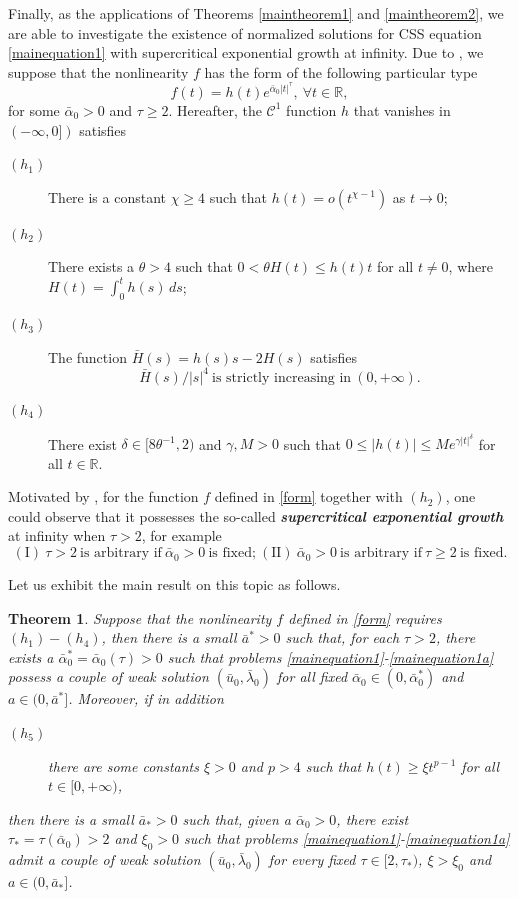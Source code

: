 \documentclass[11pt]{amsart}
\numberwithin{equation}{section}
\newtheorem{theorem}{Theorem}[section]
\theoremstyle{definition}
\newcommand{\R}{\mathbb{R}}
\begin{document}
Finally, as the
 applications of Theorems \ref{maintheorem1} and \ref{maintheorem2},
 we are able to investigate the existence of normalized solutions for CSS equation
 \eqref{mainequation1} with supercritical exponential growth at infinity. Due to
\cite{AS1,AS2}, we suppose that  the nonlinearity $f$ has the form of the following particular type
 \begin{equation}\label{form}
  f(t)=h(t) e^{\bar{\alpha}_0 |t|^\tau},~\forall t\in\R,
\end{equation}
for some $\bar{\alpha}_0>0$
 and $\tau\geq2$. Hereafter, the $\mathcal{C}^1$ function $h$ that vanishes in $(-\infty,0])$ satisfies
\begin{description}
  \item[$(h_1)$] There is a constant $\chi\geq4$ such that $h(t)=o(t^{\chi-1})$ as $t\to0$;
  \item[$(h_2)$] There exists a $\theta>4$ such that $0<\theta H(t) \leq h(t)t$ for all $t\neq0$,
	where $H(t)=\int_{0}^{t}h(s)\,ds$;
\item[$(h_3)$] The function $\bar{H}(s)=h(s)s-2H(s)$ satisfies
\[
 \bar{H}(s)/|s|^{4}~\text{is strictly increasing in}~(0,+\infty).
\]
\item[$(h_4)$] There exist $\delta \in [8\theta^{-1},2)$ and $\gamma,M>0$ such that $0 \leq |h(t)| \leq Me^{\gamma |t|^{\delta}}$
for all $t\in\R$.
\end{description}

Motivated by \cite{AS1,AS2}, for the function $f$ defined in \eqref{form} together with $(h_2)$,
one could observe that it possesses the so-called \emph{\textbf{supercritical exponential growth}} at infinity when $\tau>2$,
for example
 \begin{equation}\label{definition2}
(\text{I})~\tau > 2~\text{is arbitrary if}~\bar{\alpha}_0>0~\text{is fixed;}~
 (\text{II})~\bar{\alpha}_0>0~\text{is arbitrary if}~\tau\geq2~\text{is fixed.}
 \end{equation}

 Let us exhibit the main result on this topic as follows.

 \begin{theorem}\label{maintheorem3}
 Suppose that the nonlinearity $f$ defined in \eqref{form}
requires $(h_1)-(h_4)$, then there is a small $\bar{a}^*>0$ such that,
for each $\tau>2$, there exists a $\bar{\alpha}^*_0=\bar{\alpha}_0(\tau)>0$ such that
problems \eqref{mainequation1}-\eqref{mainequation1a} possess a couple of weak solution
$(\bar{u}_0,\bar{\lambda}_0)$ for all fixed $\bar{\alpha}_0 \in (0, \bar{\alpha}_0^*)$ and $a\in(0,\bar{a}^*]$.
Moreover, if in addition
\begin{description}
 \item[$(h_5)$] there are some constants $\xi>0$ and $p>4$ such that $h(t)\geq \xi t^{p-1}$ for all $t\in[0,+\infty)$,
\end{description}
then there is a small $\bar{a}_*>0$ such that,
given a
$\bar{\alpha}_0>0$, there exist $\tau_*=\tau(\bar{\alpha}_0)>2$ and ${\xi}_0>0$
such that problems \eqref{mainequation1}-\eqref{mainequation1a} admit a couple of weak solution $(\bar{u}_0,\bar{\lambda}_0)$
 for every fixed $\tau \in [2,\tau_*)$,
  ${\xi}>{\xi}_0$ and $a\in(0,\bar{a}_*]$.
\end{theorem}
\end{document}
